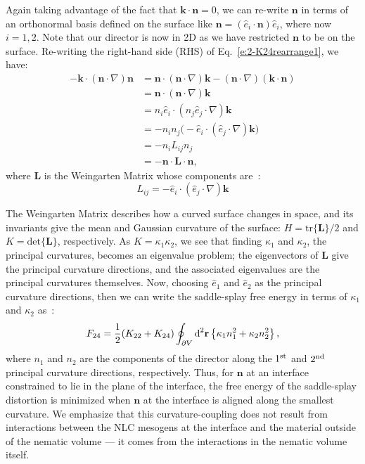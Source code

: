 Again taking advantage of the fact that $\mathbf{k} \cdot \mathbf{n} = 0$, we can re-write $\mathbf{n}$ in terms of an orthonormal basis defined on the surface like $\mathbf{n} = (\hat{e}_i \cdot \mathbf{n})\hat{e}_i$, where now $i = 1,2$.
Note that our director is now in 2D as we have restricted $\mathbf{n}$ to be on the surface.
Re-writing the right-hand side (RHS) of Eq.~\ref{e:2-K24rearrange1}, we have:
\begin{align}
  -\mathbf{k} \cdot (\mathbf{n} \cdot \nabla)\mathbf{n}
  &= \mathbf{n} \cdot (\mathbf{n} \cdot \nabla)\mathbf{k} - (\mathbf{n} \cdot \nabla)(\mathbf{k} \cdot \mathbf{n}) \\
  &= \mathbf{n} \cdot (\mathbf{n} \cdot \nabla)\mathbf{k} \\
  &= n_i \hat{e}_i \cdot (n_j \hat{e}_j \cdot \nabla) \mathbf{k} \\
  &=- n_i n_j \big ( - \hat{e}_i \cdot ( \hat{e}_j \cdot \nabla) \mathbf{k} \big ) \\
  &= - n_i L_{ij} n_j \\
  &= -\mathbf{n} \cdot \mathbf{L} \cdot \mathbf{n},\label{e:2-K24rearrange2}
\end{align}
where $\mathbf{L}$ is the Weingarten Matrix whose components are~\cite{RN23,RN35}:
\begin{equation}
  L_{ij} = - \hat{e}_i \cdot (\hat{e}_j \cdot \nabla) \mathbf{k}\label{e:2-WeingartenMatrix}
\end{equation}

The Weingarten Matrix describes how a curved surface changes in space, and its invariants give the mean and Gaussian curvature of the surface: $H = \textrm{tr}\{\mathbf{L}\}/2$ and $K = \textrm{det} \{ \mathbf{L} \}$, respectively.
As $K = \kappa_1 \kappa_2$, we see that finding $\kappa_1$ and $\kappa_2$, the principal curvatures, becomes an eigenvalue problem; the eigenvectors of $\mathbf{L}$ give the principal curvature directions, and the associated eigenvalues are the principal curvatures themselves.
Now, choosing $\hat{e}_1$ and $\hat{e}_2$ as the principal curvature directions, then we can write the saddle-splay free energy in terms of $\kappa_1$ and $\kappa_2$ as~\cite{RN59}:
\begin{equation}
  F_{24} = \frac{1}{2}(K_{22} + K_{24})
  \oint_{\partial V}\textup{d}^2 \mathbf{r} \left \{\kappa_1 n_1^2 + \kappa_2 n_2^2 \right \},\label{e:2-K24SurfCouple}
\end{equation}
where $n_1$ and $n_2$ are the components of the director along the $1^{\rm st}$ and $2^{\rm nd}$ principal curvature directions, respectively.
Thus, for $\mathbf{n}$ at an interface constrained to lie in the plane of the interface, the free energy of the saddle-splay distortion is minimized when $\mathbf{n}$ at the interface is aligned along the smallest curvature.
We emphasize that this curvature-coupling does not result from interactions between the NLC mesogens at the interface and the material outside of the nematic volume --- it comes from the interactions in the nematic volume itself.




